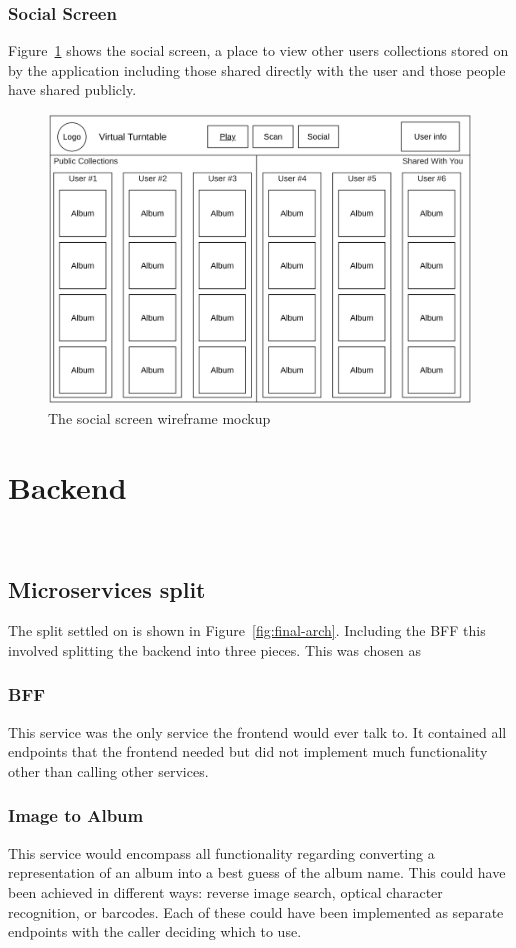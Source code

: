 \subsubsection{Social Screen}
Figure~\ref{fig:social_screen_mockup} shows the social screen, a place to view other users collections stored on by the application including those shared directly with the user and those people have shared publicly.
\begin{figure} [H]
    \centering
    \includegraphics[width=0.6\linewidth]{figures/social_screen_mockup.png}
    \caption{The social screen wireframe mockup}
    \label{fig:social_screen_mockup}
\end{figure}

\section{Backend}~\label{sec:backend-design}
\subsection{Microservices split}
The split settled on is shown in Figure~\ref{fig:final-arch}. Including the BFF this involved splitting the backend into three pieces. This was chosen as

\subsubsection{BFF}
This service was the only service the frontend would ever talk to. It contained all endpoints that the frontend needed but did not implement much functionality other than calling other services.
\subsubsection{Image to Album}
This service would encompass all functionality regarding converting a representation of an album into a best guess of the album name. This could have been achieved in different ways: reverse image search, optical character recognition, or barcodes. Each of these could have been implemented as separate endpoints with the caller deciding which to use.
